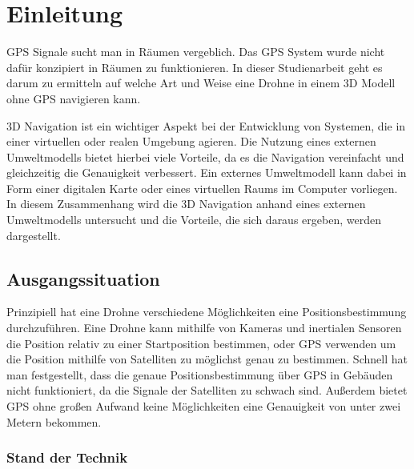 \chapter{Einleitung}

GPS Signale sucht man in Räumen vergeblich. Das GPS System wurde nicht dafür konzipiert in Räumen zu funktionieren.
In dieser Studienarbeit geht es darum zu ermitteln auf welche Art und Weise eine Drohne in einem 3D Modell ohne GPS navigieren kann.

3D Navigation ist ein wichtiger Aspekt bei der Entwicklung von Systemen, die in einer virtuellen oder realen Umgebung agieren. Die Nutzung eines externen Umweltmodells bietet hierbei viele Vorteile, da es die Navigation vereinfacht und gleichzeitig die Genauigkeit verbessert. Ein externes Umweltmodell kann dabei in Form einer digitalen Karte oder eines virtuellen Raums im Computer vorliegen. In diesem Zusammenhang wird die 3D Navigation anhand eines externen Umweltmodells untersucht und die Vorteile, die sich daraus ergeben, werden dargestellt.



\section{Ausgangssituation}

Prinzipiell hat eine Drohne verschiedene Möglichkeiten eine Positionsbestimmung durchzuführen.
Eine Drohne kann mithilfe von Kameras und inertialen Sensoren die Position relativ zu einer Startposition bestimmen, oder \ac{GPS} verwenden um die Position mithilfe von Satelliten zu möglichst genau zu bestimmen.
Schnell hat man festgestellt, dass die genaue Positionsbestimmung über GPS in Gebäuden nicht funktioniert, da die Signale der Satelliten zu schwach sind. Außerdem bietet \ac{GPS} ohne großen Aufwand keine Möglichkeiten eine Genauigkeit von unter zwei Metern bekommen.

\subsection{Stand der Technik}


